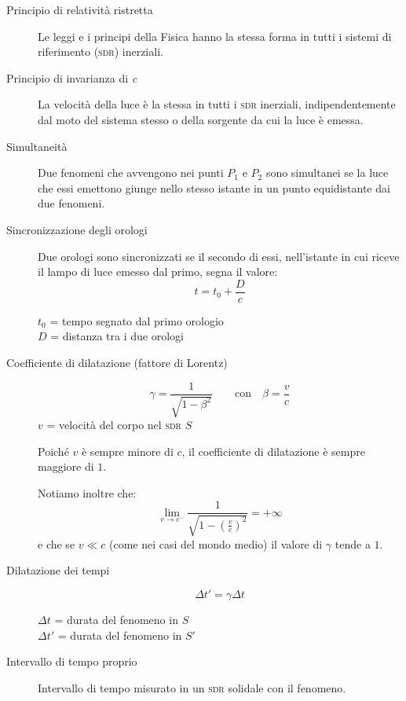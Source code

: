 \documentclass[a4paper,11pt,italian]{article}
\begin{document}
\begin{description}
  \item[Principio di relatività ristretta]
  Le leggi e i principi della Fisica hanno la stessa forma in tutti i sistemi di riferimento (\textsc{sdr}) inerziali.
  
  \item[Principio di invarianza di \textit{c}]
  La velocità della luce è la stessa in tutti i \textsc{sdr} inerziali, indipendentemente dal moto del sistema stesso o della sorgente da cui la luce è emessa.
  
  \item[Simultaneità]
  Due fenomeni che avvengono nei punti $ P_1 $ e $ P_2 $ sono simultanei se la luce che essi emettono giunge nello stesso istante in un punto equidistante dai due fenomeni.
  
  \item[Sincronizzazione degli orologi]
  Due orologi sono sincronizzati se il secondo di essi, nell'istante in cui riceve il lampo di luce emesso dal primo, segna il valore:
  \[ t = t_0 + \frac{D}{c} \]
  \begin{multicols}{2}
  $ t_0 $ = tempo segnato dal primo orologio\\
  $ D $ = distanza tra i due orologi
  \end{multicols}
  
  \item[Coefficiente di dilatazione (fattore di Lorentz)]
  \[ \gamma = \frac{1}{\sqrt{1-\beta^2}} \qquad \mathrm{con} \quad \beta = \frac{v}{c} \]
  $ v $ = velocità del corpo nel \textsc{sdr} $ S $
  
  Poiché $ v $ è sempre minore di $ c $, il coefficiente di dilatazione è sempre maggiore di $ 1 $.
  
  Notiamo inoltre che:
  \[ \lim_{v \rightarrow c^{-}} \frac{1}{\sqrt{1-(\frac{v}{c})^2}} = + \infty \]
  e che se $ v \ll c $ (come nei casi del mondo medio) il valore di $ \gamma $ tende a $ 1 $.
  
  \item[Dilatazione dei tempi]
  \[ \Delta t' = \gamma \Delta t \]
  \begin{multicols}{2}
  $ \Delta t $ = durata del fenomeno in $ S $\\
  $ \Delta t' $ = durata del fenomeno in $ S' $
  \end{multicols}
  
  \item[Intervallo di tempo proprio]
  Intervallo di tempo misurato in un \textsc{sdr} solidale con il fenomeno.
  

\end{description}
\end{document}
